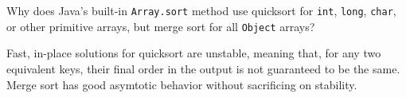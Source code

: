 \question Why does Java's built-in \lstinline$Array.sort$ method use quicksort
for \lstinline$int$, \lstinline$long$, \lstinline$char$, or other primitive
arrays, but merge sort for all \lstinline$Object$ arrays?

\begin{solution}[1in]
Fast, in-place solutions for quicksort are unstable, meaning that, for any two
equivalent keys, their final order in the output is not guaranteed to be the
same. Merge sort has good asymtotic behavior without sacrificing on stability.
\end{solution}
